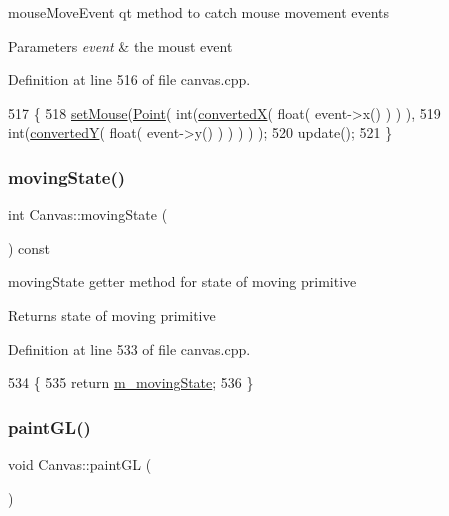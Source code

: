 mouse\+Move\+Event qt method to catch mouse movement events 


\begin{DoxyParams}{Parameters}
{\em event} & the moust event \\
\hline
\end{DoxyParams}


Definition at line 516 of file canvas.\+cpp.


\begin{DoxyCode}
517 \{
518     \hyperlink{class_canvas_a104679999425d8ffdc27454b71e5e1e3}{setMouse}(\hyperlink{class_point}{Point}( \textcolor{keywordtype}{int}(\hyperlink{class_canvas_afddf8ae4dcfb9557ae557b9f998f5d5a}{convertedX}( \textcolor{keywordtype}{float}( event->x() ) ) ),
519                      \textcolor{keywordtype}{int}(\hyperlink{class_canvas_a12cbc7e3a2cb3bbb6278052d49a90313}{convertedY}( \textcolor{keywordtype}{float}( event->y() ) ) ) ) );
520     update();
521 \}
\end{DoxyCode}
\mbox{\label{class_canvas_a8097ff7e44fb5fecf0dd0997e13e4c32}} 
\subsubsection{\texorpdfstring{moving\+State()}{movingState()}}
{\footnotesize\ttfamily int Canvas\+::moving\+State (\begin{DoxyParamCaption}{ }\end{DoxyParamCaption}) const}



moving\+State getter method for state of moving primitive 

\begin{DoxyReturn}{Returns}
state of moving primitive 
\end{DoxyReturn}


Definition at line 533 of file canvas.\+cpp.


\begin{DoxyCode}
534 \{
535     \textcolor{keywordflow}{return} \hyperlink{class_canvas_a0d0f98258b42bd7b40f175baf3f1220a}{m\_movingState};
536 \}
\end{DoxyCode}
\mbox{\label{class_canvas_a4e9439400dd404eda24cf42ca5ca9972}} 
\subsubsection{\texorpdfstring{paint\+G\+L()}{paintGL()}}
{\footnotesize\ttfamily void Canvas\+::paint\+GL (\begin{DoxyParamCaption}{ }\end{DoxyParamCaption})}



